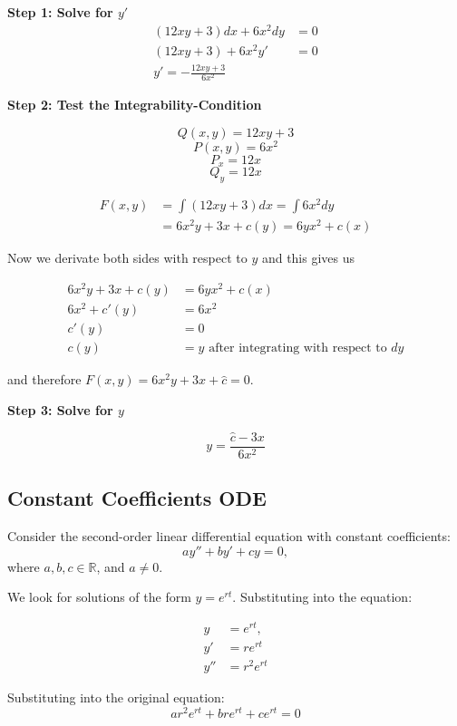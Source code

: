 \textbf{Step 1: Solve for \(y'\)}
\begin{align*}
    (12xy + 3)dx + 6x^2dy &= 0\\
    (12xy + 3) + 6x^2 y' &= 0\\
    y' = - \frac{12xy + 3}{6x^2}
\end{align*}

\textbf{Step 2: Test the Integrability-Condition}

\[Q(x,y) = 12xy + 3\]
\[P(x,y) = 6x^2\] 
\[P_x = 12x\]
\[Q_y = 12x\]

\begin{align*}
F(x,y) &= \int (12xy + 3)dx = \int 6x^2 dy\\
       &= 6x^2 y + 3x + c(y) = 6yx^2 + c(x)
\end{align*}

Now we derivate both sides with respect to \(y\) and this gives us

\begin{align*}
    6x^2y + 3x + c(y) &= 6yx^2 + c(x) \\
    6x^2 + c'(y) &= 6x^2 \\
           c'(y) &= 0 \\
            c(y) &= y \text{ after integrating with respect to } dy
\end{align*}

and therefore \(F(x,y) = 6x^2y + 3x + \hat{c} = 0\).
\vspace{\baselineskip}

\textbf{Step 3: Solve for \(y\)}

\[y = \frac{\hat{c} - 3x}{6x^2} \]

\subsection{Constant Coefficients ODE}

Consider the second-order linear differential equation with constant coefficients:
\[
a y'' + b y' + c y = 0,
\]
where \( a, b, c \in \mathbb{R} \), and \( a \neq 0 \).

We look for solutions of the form \( y = e^{rt} \). Substituting into the equation:

\begin{align*}
y &= e^{rt}, \\
y' &= r e^{rt} \\
y'' &=  r^2 e^{rt}
\end{align*}


Substituting into the original equation:
\[
ar^2 e^{rt} + bre^{rt} + ce^{rt} = 0
\]

